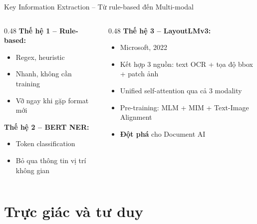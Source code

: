 \documentclass[aspectratio=169]{beamer}
\begin{document}
\begin{frame}{Key Information Extraction -- Từ rule-based đến Multi-modal}
    \begin{columns}[T]
        \begin{column}{0.48\textwidth}
            \textbf{Thế hệ 1 -- Rule-based:}
            \begin{itemize}
                \item Regex, heuristic
                \item Nhanh, không cần training
                \item Vỡ ngay khi gặp format mới
            \end{itemize}
            \vspace{0.3cm}
            \textbf{Thế hệ 2 -- BERT NER:}
            \begin{itemize}
                \item Token classification
                \item Bỏ qua thông tin vị trí không gian
            \end{itemize}
        \end{column}
        \begin{column}{0.48\textwidth}
            \textbf{Thế hệ 3 -- LayoutLMv3:}
            \begin{itemize}
                \item Microsoft, 2022
                \item Kết hợp 3 nguồn: text OCR + tọa độ bbox + patch ảnh
                \item Unified self-attention qua cả 3 modality
                \item Pre-training: MLM + MIM + Text-Image Alignment
                \item \textbf{Đột phá} cho Document AI
            \end{itemize}
        \end{column}
    \end{columns}
\end{frame}

\section{Trực giác và tư duy}
\end{document}
